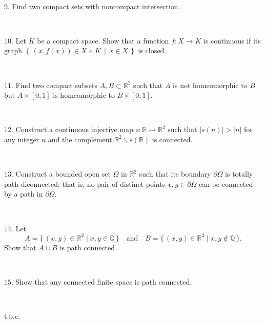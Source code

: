 \documentclass{article}
\def\noi{\noindent}%
\def\RR{\mathbb{R}}%
\def\QQ{\mathbb{Q}}%
\def\i{\subset}
\def\:{\colon}
\newcommand{\set}[2]{\left\{\,#1\,\middle|\,#2\,\right\}}
\begin{document}
\ 

\noi $9.$ Find two compact sets with noncompact intersection.

\ 

\noi $10.$ Let $K$ be a compact space.
Show that a function $f\:X\to K$ is continuous if its graph $\set{(x,f(x))\in X\times K}{x\in X}$ is closed. 

\ 

\noi $11$. Find two compact subsets $A,B\i\RR^2$ such that 
$A$ is not homeomorphic to $B$ but $A\times[0,1]$ is homeomorphic to $B\times[0,1]$.

\ 

\noi $12$. Construct a continuous injective map $s\:\RR\to\RR^2$ such that $|s(n)|>|n|$ for any integer $n$ and the complement $\RR^2\backslash s(\RR)$ is connected. 

\ 

\noi $13.$
Construct a bounded open set $\Omega$ in $\RR^2$
such that its boundary $\partial \Omega$ is totally path-diconnected;
that is, no pair of distinct points $x,y\in\partial \Omega$ can be connected by a path in $\partial \Omega$.

\ 

\noi $14.$ Let
\[A=\{\,(x,y)\in\RR^2\mid x,y\in\QQ\,\}
\quad\text{and}\quad
B=\{\,(x,y)\in\RR^2\mid x,y\notin\QQ\,\}.\]
Show that $A\cup B$ is path connected.

\ 

\noi $15.$ Show that any connected finite space is path connected.

\ 

\noi t.b.c.
\end{document}
